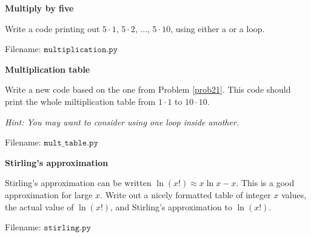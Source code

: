 
\begin{Problem}{\textbf{Multiply by five}} \label{prob21}

\noindent Write a code printing out $5\cdot 1$, $5\cdot 2$, ..., $5\cdot 10$, using either
a  or a  loop.

Filename: $\texttt{multiplication.py}$
\end{Problem}


\begin{Problem}{\textbf{Multiplication table}}\label{prob22}

\noindent Write a new code based on the one from Problem \ref{prob21}. This code should print the
whole miltiplication table from $1\cdot 1$ to $10 \cdot 10$.

\emph{Hint: You may want to consider using one loop inside another.}

Filename: $\texttt{mult\_table.py}$
\end{Problem}

\begin{Problem}{\textbf{Stirling's approximation}}\label{prob23}

\noindent Stirling's approximation can be written $\ln (x!) \approx x\ln x - x$. This is a 
good approximation for large $x$. Write out a nicely formatted table of integer
$x$ values, the actual value of $\ln (x!)$, and Stirling's approximation to $\ln (x!)$.

Filename: $\texttt{stirling.py}$
\end{Problem}
	
